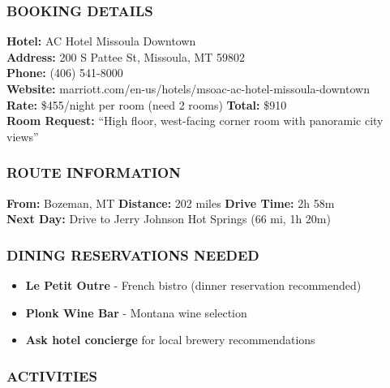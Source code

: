 \documentclass[
  11pt,
]{article}
\providecommand{\tightlist}{%
  \setlength{\itemsep}{0pt}\setlength{\parskip}{0pt}}
\begin{document}
\subsubsection{\texorpdfstring{\textcolor{primary}{BOOKING DETAILS}}{}}\label{section-12}

\textbf{\textcolor{secondary}{Hotel:}} AC Hotel Missoula Downtown\\
\textbf{\textcolor{secondary}{Address:}} 200 S Pattee St, Missoula, MT
59802\\
\textbf{\textcolor{secondary}{Phone:}} (406) 541-8000\\
\textbf{\textcolor{secondary}{Website:}}
marriott.com/en-us/hotels/msoac-ac-hotel-missoula-downtown\\
\textbf{\textcolor{secondary}{Rate:}} \$455/night per room (need 2
rooms) \textbar{} \textbf{\textcolor{secondary}{Total:}} \$910\\
\textbf{\textcolor{secondary}{Room Request:}} ``High floor, west-facing
corner room with panoramic city views''

\subsubsection{\texorpdfstring{\textcolor{primary}{ROUTE INFORMATION}}{}}\label{section-13}

\textbf{\textcolor{secondary}{From:}} Bozeman, MT \textbar{}
\textbf{\textcolor{secondary}{Distance:}} 202 miles \textbar{}
\textbf{\textcolor{secondary}{Drive Time:}} 2h 58m\\
\textbf{\textcolor{secondary}{Next Day:}} Drive to Jerry Johnson Hot
Springs (66 mi, 1h 20m)

\subsubsection{\texorpdfstring{\textcolor{primary}{DINING RESERVATIONS NEEDED}}{}}\label{section-14}

\begin{itemize}
\tightlist
\item
  \textbf{\textcolor{secondary}{Le Petit Outre}} - French bistro (dinner
  reservation recommended)
\item
  \textbf{\textcolor{secondary}{Plonk Wine Bar}} - Montana wine
  selection
\item
  \textbf{\textcolor{secondary}{Ask hotel concierge}} for local brewery
  recommendations
\end{itemize}

\subsubsection{\texorpdfstring{\textcolor{primary}{ACTIVITIES}}{}}\label{section-15}
\end{document}
